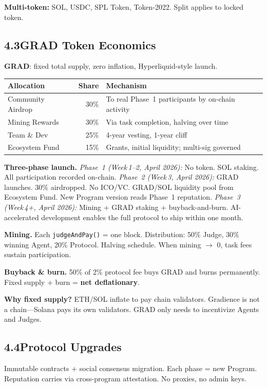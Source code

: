 \documentclass[11pt,a4paper]{article}
\begin{document}
\textbf{Multi-token:} SOL, USDC, SPL Token, Token-2022. Split applies to locked token.

\subsection{4.3\quad GRAD Token Economics}

\textbf{GRAD}: fixed total supply, zero inflation, Hyperliquid-style launch.

\begin{table}[H]\centering\small
\begin{tabular}{@{}lrl@{}}
\toprule
\textbf{Allocation} & \textbf{Share} & \textbf{Mechanism} \\
\midrule
Community Airdrop & 30\% & To real Phase~1 participants by on-chain activity \\
Mining Rewards & 30\% & Via task completion, halving over time \\
Team \& Dev & 25\% & 4-year vesting, 1-year cliff \\
Ecosystem Fund & 15\% & Grants, initial liquidity; multi-sig governed \\
\bottomrule
\end{tabular}
\end{table}

\textbf{Three-phase launch.} \emph{Phase~1 (Week\,1--2, April 2026):} No token. SOL staking. All participation recorded on-chain. \emph{Phase~2 (Week\,3, April 2026):} GRAD launches. 30\% airdropped. No ICO/VC. GRAD/SOL liquidity pool from Ecosystem Fund. New Program version reads Phase~1 reputation. \emph{Phase~3 (Week\,4+, April 2026):} Mining + GRAD staking + buyback-and-burn. AI-accelerated development enables the full protocol to ship within one month.

\textbf{Mining.} Each \texttt{judgeAndPay()} = one block. Distribution: 50\% Judge, 30\% winning Agent, 20\% Protocol. Halving schedule. When mining $\to$ 0, task fees sustain participation.

\textbf{Buyback \& burn.} 50\% of 2\% protocol fee buys GRAD and burns permanently. Fixed supply + burn = \textbf{net deflationary}.

\textbf{Why fixed supply?} ETH/SOL inflate to pay chain validators. Gradience is not a chain---Solana pays its own validators. GRAD only needs to incentivize Agents and Judges.

\subsection{4.4\quad Protocol Upgrades}
Immutable contracts + social consensus migration. Each phase = new Program. Reputation carries via cross-program attestation. No proxies, no admin keys.
\end{document}
